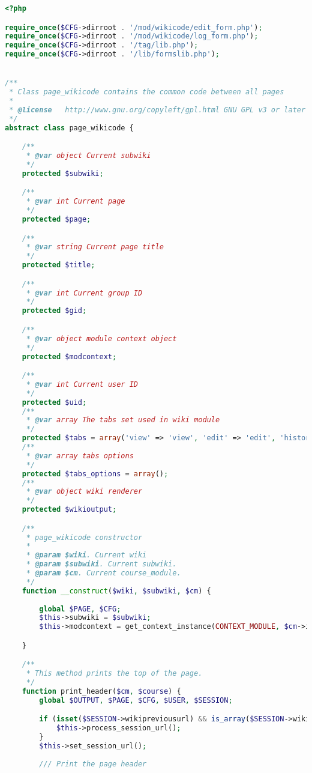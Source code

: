 \begin{lstlisting}[language=PHP]
<?php

require_once($CFG->dirroot . '/mod/wikicode/edit_form.php');
require_once($CFG->dirroot . '/mod/wikicode/log_form.php');
require_once($CFG->dirroot . '/tag/lib.php');
require_once($CFG->dirroot . '/lib/formslib.php');


/**
 * Class page_wikicode contains the common code between all pages
 *
 * @license   http://www.gnu.org/copyleft/gpl.html GNU GPL v3 or later
 */
abstract class page_wikicode {

    /**
     * @var object Current subwiki
     */
    protected $subwiki;

    /**
     * @var int Current page
     */
    protected $page;

    /**
     * @var string Current page title
     */
    protected $title;

    /**
     * @var int Current group ID
     */
    protected $gid;

    /**
     * @var object module context object
     */
    protected $modcontext;

    /**
     * @var int Current user ID
     */
    protected $uid;
    /**
     * @var array The tabs set used in wiki module
     */
    protected $tabs = array('view' => 'view', 'edit' => 'edit', 'history' => 'history', 'log' => 'log', 'admin' => 'admin');
    /**
     * @var array tabs options
     */
    protected $tabs_options = array();
    /**
     * @var object wiki renderer
     */
    protected $wikioutput;

    /**
     * page_wikicode constructor
     *
     * @param $wiki. Current wiki
     * @param $subwiki. Current subwiki.
     * @param $cm. Current course_module.
     */
    function __construct($wiki, $subwiki, $cm) {
    	
        global $PAGE, $CFG;
        $this->subwiki = $subwiki;
        $this->modcontext = get_context_instance(CONTEXT_MODULE, $cm->id);

    }

    /**
     * This method prints the top of the page.
     */
    function print_header($cm, $course) {
        global $OUTPUT, $PAGE, $CFG, $USER, $SESSION;

        if (isset($SESSION->wikipreviousurl) && is_array($SESSION->wikipreviousurl)) {
            $this->process_session_url();
        }
        $this->set_session_url();
        
        /// Print the page header


\end{lstlisting}
